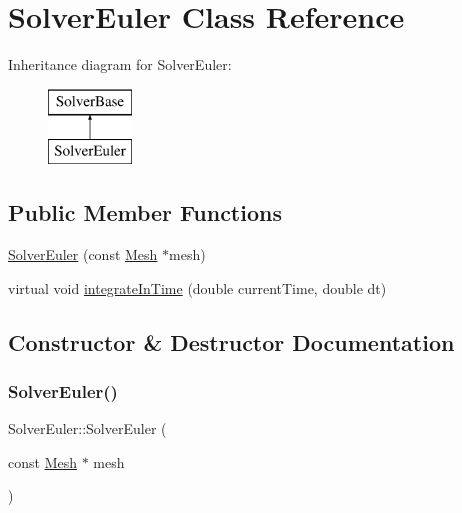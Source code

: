 \hypertarget{class_solver_euler}{}\section{Solver\+Euler Class Reference}
\label{class_solver_euler}
Inheritance diagram for Solver\+Euler\+:\begin{figure}[H]
\begin{center}
\leavevmode
\includegraphics[height=2.000000cm]{class_solver_euler}
\end{center}
\end{figure}
\subsection*{Public Member Functions}
\begin{DoxyCompactItemize}
\item 
\mbox{\hyperlink{class_solver_euler_a636fce8aa919afe62be090e99d9346bf}{Solver\+Euler}} (const \mbox{\hyperlink{class_mesh}{Mesh}} $\ast$mesh)
\item 
virtual void \mbox{\hyperlink{class_solver_euler_a64caa7276a35f9e5408bec75bc2d3189}{integrate\+In\+Time}} (double current\+Time, double dt)
\end{DoxyCompactItemize}


\subsection{Constructor \& Destructor Documentation}
\mbox{\label{class_solver_euler_a636fce8aa919afe62be090e99d9346bf}} 
\subsubsection{\texorpdfstring{Solver\+Euler()}{SolverEuler()}}
{\footnotesize\ttfamily Solver\+Euler\+::\+Solver\+Euler (\begin{DoxyParamCaption}\item[{const \mbox{\hyperlink{class_mesh}{Mesh}} $\ast$}]{mesh }\end{DoxyParamCaption})}



